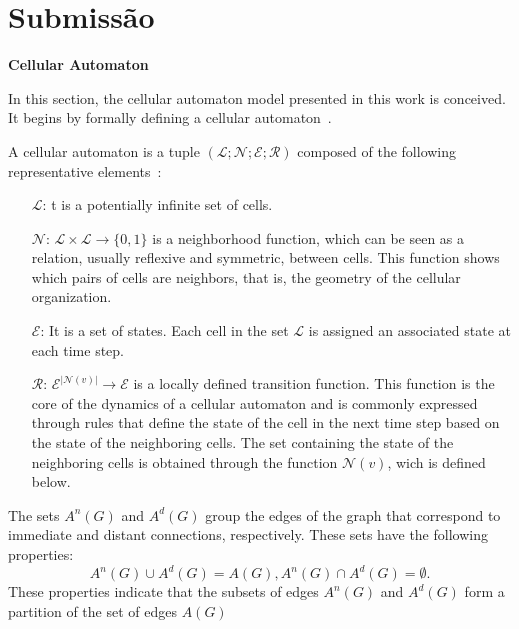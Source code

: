 \documentclass[a4paper,11pt]{article}
\begin{document}
{\section*{Submissão}

\textbf{Cellular Automaton}

In this section, the cellular automaton model presented in this work is conceived. It begins by formally defining a cellular automaton~\cite{7}.

A cellular automaton is a tuple $(\mathcal{L}; \mathcal{N}; \mathcal{E}; \mathcal{R})$ composed of the following representative elements~\cite{2}:
\begin{itemize}
\item [$\mathcal{L}$:] t is a potentially infinite set of cells.
\item [$\mathcal{N}$:] $\mathcal{L} \times \mathcal{L} \rightarrow \lbrace 0,1 \rbrace$ is a neighborhood function, which can be seen as a relation, usually reflexive and symmetric, between cells. This function shows which pairs of cells are neighbors, that is, the geometry of the cellular organization.
\item [$\mathcal{E}$:] It is a set of states. Each cell in the set $\mathcal{L}$ is assigned an associated state at each time step.
\item [$\mathcal{R}$:] $\mathcal{E}^{|\mathcal{N}(v)|} \rightarrow \mathcal{E}$ is a locally defined transition function. This function is the core of the dynamics of a cellular automaton and is commonly expressed through rules that define the state of the cell in the next time step based on the state of the neighboring cells. The set containing the state of the neighboring cells is obtained through the function $\mathcal{N}(v)$, wich is defined below.
\end{itemize}

The sets $A^n(G)$ and $A^d(G)$ group the edges of the graph that correspond to immediate and distant connections, respectively. These sets have the following properties:
\begin{subequations}
\begin{equation}
A^n(G) \cup A^d(G) = A(G),
\end{equation}
\begin{equation}
A^n(G) \cap A^d(G) = \emptyset.
\end{equation}
\end{subequations}
These properties indicate that the subsets of edges $A^n(G)$ and $A^d(G)$ form a partition of the set of edges $A(G)$

}
\end{document}
